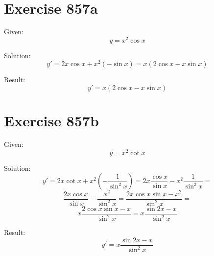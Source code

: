 \documentclass[a4paper, 10pt]{scrartcl}
\begin{document}
\section{Exercise 857a}

Given:
\[
y = x^{2}\cos{x}
\]

Solution:
\[
y' = 2x\cos{x} + x^{2}(-\sin{x}) = x(2\cos{x} - x\sin{x})
\]

Result:
\[
y' = x(2\cos{x} - x\sin{x})
\]

\section{Exercise 857b}

Given:
\[
y = x^{2}\cot{x}
\]

Solution:
\[
y' = 2x\cot{x} + x^{2}(-\frac{1}{\sin^{2}{x}}) = 2x\frac{\cos{x}}{\sin{x}} - x^{2}\frac{1}{\sin^{2}{x}} =
\]
\[
\frac{2x\cos{x}}{\sin{x}} - \frac{x^{2}}{\sin^{2}{x}} = \frac{2x\cos{x}\sin{x} - x^{2}}{\sin^{2}{x}} =
\]
\[
x\frac{2\cos{x}\sin{x} - x}{\sin^{2}{x}} = x\frac{\sin{2x} - x}{\sin^{2}{x}}
\]

Result:
\[
y' = x\frac{\sin{2x} - x}{\sin^{2}{x}}
\]
\end{document}
